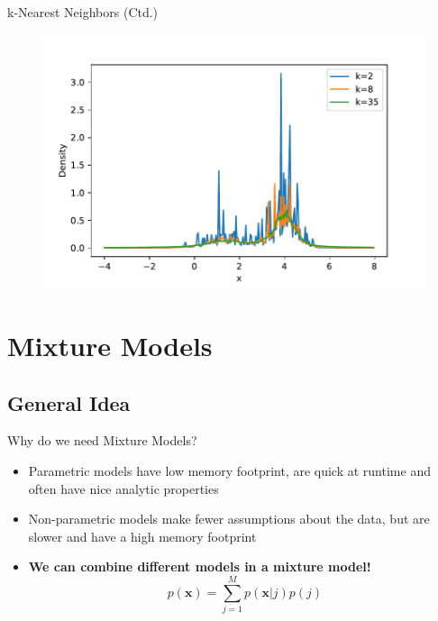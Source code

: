 \begin{frame}{k-Nearest Neighbors (Ctd.)}
	\begin{figure}
		\centering
		\includegraphics[scale=0.55]{04_density_estimation/02_img/knn}
	\end{figure}
\end{frame}


\section{Mixture Models}

\subsection{General Idea}

\begin{frame}{Why do we need Mixture Models?}{}
	\begin{itemize}
		\item Parametric models have low memory footprint, are quick at runtime and often have nice analytic properties
		\item Non-parametric models make fewer assumptions about the data, but are slower and have a high memory footprint
		\item \textbf{We can combine different models in a mixture model!}
		\begin{equation}
			p(\bm{x}) = \sum_{j=1}^M p(\bm{x}|j) p(j)
		\end{equation}
	\end{itemize}
\end{frame}

